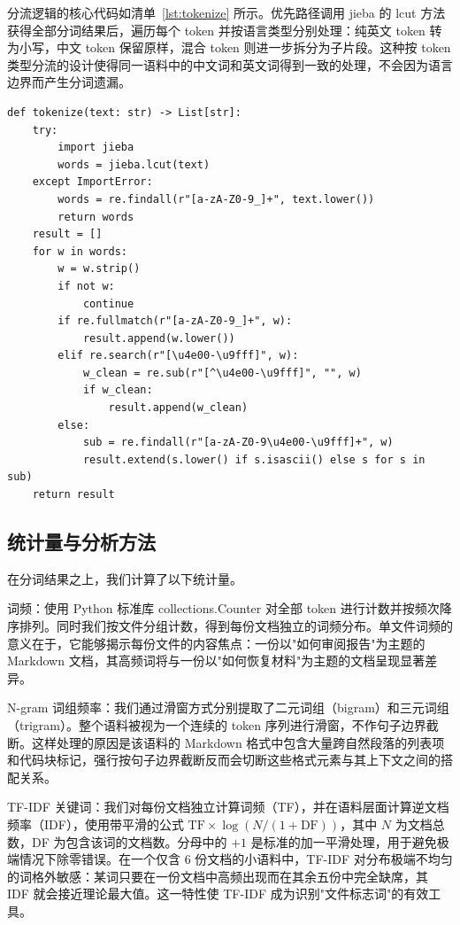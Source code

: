 \documentclass[12pt,a4paper]{ctexart}
\begin{document}
分流逻辑的核心代码如清单~\ref{lst:tokenize} 所示。优先路径调用 jieba 的 lcut 方法获得全部分词结果后，遍历每个 token 并按语言类型分别处理：纯英文 token 转为小写，中文 token 保留原样，混合 token 则进一步拆分为子片段。这种按 token 类型分流的设计使得同一语料中的中文词和英文词得到一致的处理，不会因为语言边界而产生分词遗漏。

\begin{lstlisting}[caption={分词函数的分流逻辑}, label={lst:tokenize}]
def tokenize(text: str) -> List[str]:
    try:
        import jieba
        words = jieba.lcut(text)
    except ImportError:
        words = re.findall(r"[a-zA-Z0-9_]+", text.lower())
        return words
    result = []
    for w in words:
        w = w.strip()
        if not w:
            continue
        if re.fullmatch(r"[a-zA-Z0-9_]+", w):
            result.append(w.lower())
        elif re.search(r"[\u4e00-\u9fff]", w):
            w_clean = re.sub(r"[^\u4e00-\u9fff]", "", w)
            if w_clean:
                result.append(w_clean)
        else:
            sub = re.findall(r"[a-zA-Z0-9\u4e00-\u9fff]+", w)
            result.extend(s.lower() if s.isascii() else s for s in sub)
    return result
\end{lstlisting}

\subsection{统计量与分析方法}

在分词结果之上，我们计算了以下统计量。

词频：使用 Python 标准库 collections.Counter 对全部 token 进行计数并按频次降序排列。同时我们按文件分组计数，得到每份文档独立的词频分布。单文件词频的意义在于，它能够揭示每份文件的内容焦点：一份以"如何审阅报告"为主题的 Markdown 文档，其高频词将与一份以"如何恢复材料"为主题的文档呈现显著差异。

N-gram 词组频率：我们通过滑窗方式分别提取了二元词组（bigram）和三元词组（trigram）。整个语料被视为一个连续的 token 序列进行滑窗，不作句子边界截断。这样处理的原因是该语料的 Markdown 格式中包含大量跨自然段落的列表项和代码块标记，强行按句子边界截断反而会切断这些格式元素与其上下文之间的搭配关系。

TF-IDF 关键词：我们对每份文档独立计算词频（TF），并在语料层面计算逆文档频率（IDF），使用带平滑的公式 \( \text{TF} \times \log(N / (1 + \text{DF})) \)，其中 \(N\) 为文档总数，DF 为包含该词的文档数。分母中的 \(+1\) 是标准的加一平滑处理，用于避免极端情况下除零错误。在一个仅含 6 份文档的小语料中，TF-IDF 对分布极端不均匀的词格外敏感：某词只要在一份文档中高频出现而在其余五份中完全缺席，其 IDF 就会接近理论最大值。这一特性使 TF-IDF 成为识别"文件标志词"的有效工具。
\end{document}
